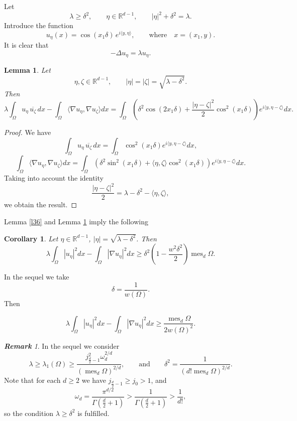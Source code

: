 \documentclass[a4paper,12pt]{article}
\numberwithin{equation}{section}
\def \de{\delta}
\def \ze{\zeta}
\def \la{\lambda}
\def \oo{\omega}
\def \G{\Gamma}
\def \D{\Delta}
\def \O{\Omega}
\def \R{\mathbb{R}}
\def\n{\nabla}
\def\mes{\operatorname{mes}}
\newcommand{\<}{\langle}
\renewcommand{\>}{\rangle}
\theoremstyle{plain}
\newtheorem{lemma}[theorem]{\bf Lemma}
\newtheorem{cor}[theorem]{\bf Corollary}
\theoremstyle{definition}
\theoremstyle{remark}
\newtheorem{rem}[theorem]{\bf Remark}
\renewcommand{\ge}{\geqslant}
\begin{document}
Let
$$
\la \ge \de^2, \qquad \eta \in \R^{d-1}, \qquad |\eta|^2 + \de^2 = \la.
$$
Introduce the function
\begin{equation}
\label{34}
u_\eta (x) = \cos (x_1 \de) \,e^{i\<y,\eta\>},
\qquad \text{where} \quad x = (x_1, y).
\end{equation}
It is clear that
\begin{equation}
\label{35}
- \D u_\eta = \la u_\eta.
\end{equation}

\begin{lemma}
\label{l37}
Let
$$
\eta, \ze \in \R^{d-1}, \qquad
|\eta| = |\ze| = \sqrt{\la - \de^2}.
$$
Then
$$
\la \int_\O u_\eta\, \overline{u_\ze}\, dx - \int_\O \<\n u_\eta, \n u_\ze\> dx
= \int_\O \left(\de^2 \cos(2x_1\de) + \frac{|\eta-\ze|^2}2 \cos^2 (x_1\de)\right)
e^{i\<y, \eta-\ze\>} dx.
$$
\end{lemma}

\begin{proof}
We have
$$
\int_\O u_\eta\, \overline{u_\ze}\, dx
= \int_\O \cos^2 (x_1\de) e^{i\<y, \eta-\ze\>} dx,
$$
$$
\int_\O \<\n u_\eta, \n u_\ze\> dx
= \int_\O \left(\de^2 \sin^2 (x_1 \de) + \<\eta, \ze\> \cos^2 (x_1 \de)\right) e^{i\<y, \eta-\ze\>} dx.
$$
Taking into account the identity
$$
\frac{|\eta-\ze|^2}2 = \la - \de^2 - \<\eta,\ze\>,
$$
we obtain the result.
\end{proof}

Lemma \ref{l36} and Lemma \ref{l37} imply the following

\begin{cor}
\label{c38}
Let $\eta \in \R^{d-1}$, $|\eta| = \sqrt{\la - \de^2}$.
Then
$$
\la \int_\O |u_\eta|^2 dx - \int_\O |\n u_\eta|^2 dx 
\ge \de^2 \left(1 - \frac{w^2\de^2}2\right) \mes_d \O.
$$
\end{cor}

In the sequel we take
$$
\de = \frac1{w(\O)}.
$$
Then

\begin{equation}
\label{36}
\la \int_\O |u_\eta|^2 dx - \int_\O |\n u_\eta|^2 dx 
\ge \frac{\mes_d \O}{2 w(\O)^2}.
\end{equation}

\begin{rem}
In the sequel we consider 
$$
\la \ge \la_1 (\O) \ge \frac{j_{\frac{d}2-1}^2 \oo_d^{2/d}}{(\mes_d \O)^{2/d}},
\qquad \text{and} \qquad \de^2 = \frac1{\left(d! \mes_d\O\right)^{2/d}}.
$$
Note that for each $d \ge 2$ we have
$j_{\frac{d}2-1} \ge j_0 > 1$, and
$$
\oo_d = \frac{\pi^{d/2}}{\G \left(\frac{d}2+1\right)} 
> \frac1{\G \left(\frac{d}2+1\right)} > \frac1{d!},
$$ 
so the condition $\la \ge \de^2$ is fulfilled.
\end{rem}
\end{document}
